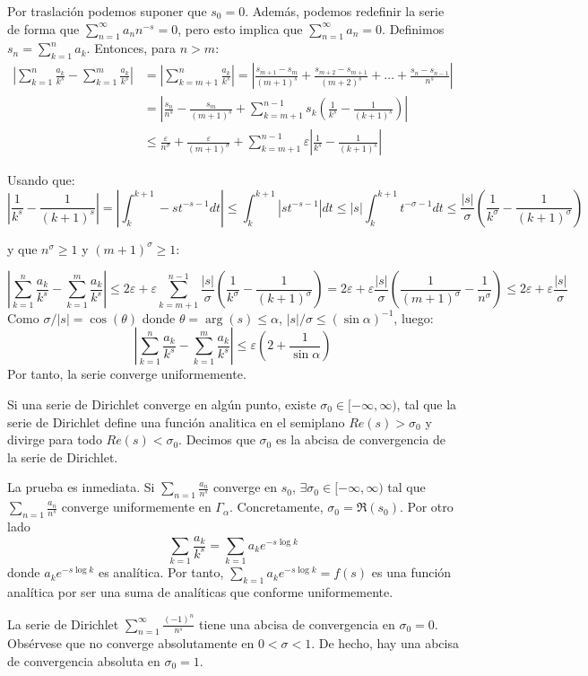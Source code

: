 \documentclass[TAN.tex]{subfiles}
\begin{document}
\begin{dem}
Por traslación podemos suponer que $s_0=0$. Además, podemos redefinir la serie de forma que $\sum_{n=1}^\infty a_n n^{-s} = 0$, pero esto implica que $\sum_{n=1}^\infty a_n = 0$. Definimos $s_n = \sum_{k=1}^n a_k$. Entonces, para $n>m$:
\begin{align*}
\left|\sum_{k=1}^n\frac{a_k}{k^s}-\sum_{k=1}^m\frac{a_k}{k^s}\right| &= \left|\sum_{k=m+1}^n\frac{a_k}{k^s}\right| = \left|\frac{s_{m+1}-s_m}{(m+1)^s} + \frac{s_{m+2}-s_{m+1}}{(m+2)^s}+\dots+\frac{s_{n}-s_{n-1}}{n^s}\right|\\
&= \left|\frac{s_n}{n^s}-\frac{s_m}{(m+1)^s}+\sum_{k=m+1}^{n-1}s_k\left(\frac{1}{k^s}-\frac{1}{(k+1)^s}\right)\right|\\
& ≤ \frac{\varepsilon}{n^σ} + \frac{\varepsilon}{(m+1)^σ} + \sum_{k=m+1}^{n-1} \varepsilon \left|\frac{1}{k^s}-\frac{1}{(k+1)^s}\right|
\end{align*}

Usando que:
\[ \left|\frac{1}{k^s}-\frac{1}{(k+1)^s}\right| = \left|\int_k^{k+1}-st^{-s-1}dt\right|≤ \int_k^{k+1}\left|st^{-s-1}\right|dt ≤ |s|\int_k^{k+1}t^{-σ-1}dt ≤ \frac{|s|}{σ} \left(\frac{1}{k^σ}-\frac{1}{(k+1)^σ}\right)\]

y que $n^σ ≥ 1$ y $(m+1)^σ ≥ 1$:

\[ \left|\sum_{k=1}^n\frac{a_k}{k^s}-\sum_{k=1}^m\frac{a_k}{k^s}\right| ≤ 2\varepsilon + \varepsilon \sum_{k=m+1}^{n-1} \frac{|s|}{σ}\left(\frac{1}{k^σ}-\frac{1}{(k+1)^σ}\right) = 2\varepsilon+\varepsilon\frac{|s|}{σ}\left(\frac{1}{(m+1)^σ}-\frac{1}{n^σ}\right) ≤ 2\varepsilon+\varepsilon\frac{|s|}{σ} \]
Como $σ/|s| = \cos(θ)$ donde $θ = \arg(s) ≤ α$, $|s|/σ ≤ (\sin α)^{-1}$, luego:
\[ \left|\sum_{k=1}^n\frac{a_k}{k^s}-\sum_{k=1}^m\frac{a_k}{k^s}\right| ≤ \varepsilon\left(2+\frac{1}{\sin α}\right) \]
Por tanto, la serie converge uniformemente.
\end{dem}

\begin{coro}
Si una serie de Dirichlet converge en algún punto, existe $σ_0 \in [-\infty,\infty)$, tal que la serie de Dirichlet define una función analitica en el semiplano $Re(s) > σ_0$ y divirge para todo $Re(s) < σ_0$. Decimos que $σ_0$ es la abcisa de convergencia de la serie de Dirichlet.
\end{coro}
\begin{dem}
La prueba es inmediata. Si $\sum_{n=1}\frac{a_n}{n^s}$ converge en $s_0$, $\exists \sigma_0\in[-\infty,\infty)$ tal que $\sum_{n=1}\frac{a_n}{n^s}$ converge uniformemente en $\Gamma_\alpha$. Concretamente, $\sigma_0 = \Re(s_0)$. Por otro lado
$$
\sum_{k=1} \frac{a_k}{k^s} = \sum_{k=1}a_ke^{-s\log k}
$$
donde $a_ke^{-s\log k}$ es analítica. Por tanto, $\sum_{k=1}a_ke^{-s\log k} = f(s)$ es una función analítica por ser una suma de analíticas que conforme uniformemente.
\end{dem}
\begin{ej}
La serie de Dirichlet $\sum_{n=1}^\infty \frac{(-1)^n}{n^s}$ tiene una abcisa de convergencia en $σ_0=0$. Obsérvese que no converge absolutamente en $0<σ<1$. De hecho, hay una abcisa de convergencia absoluta en $σ_0=1$.
\end{ej}
\end{document}
